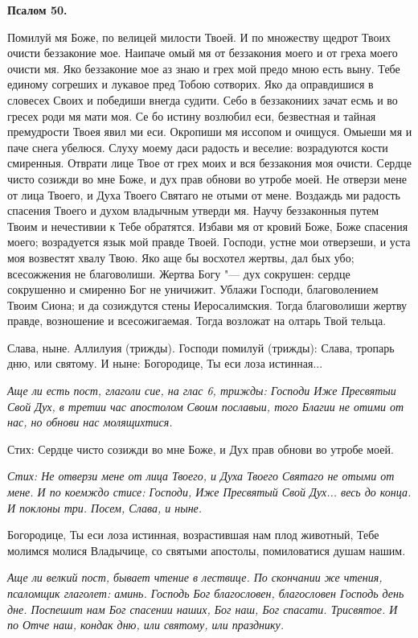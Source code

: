 \medskip


\bfseries Псалом 50.\normalfont{}\nopagebreak


Помилуй мя Боже, по велицей милости Твоей. И по множеству щедрот Твоих очисти беззаконие мое. Наипаче омый мя от беззакония моего и от греха моего очисти мя. Яко беззаконие мое аз знаю и грех мой предо мною есть выну. Тебе единому согреших и лукавое пред Тобою сотворих. Яко да оправдишися в словесех Своих и победиши внегда судити. Себо в беззакониих зачат есмь и во гресех роди мя мати моя. Се бо истину возлюбил еси, безвестная и тайная премудрости Твоея явил ми еси. Окропиши мя иссопом и очищуся. Омыеши мя и паче снега убелюся. Слуху моему даси радость и веселие: возрадуются кости смиренныя. Отврати лице Твое от грех моих и вся беззакония моя очисти. Сердце чисто созижди во мне Боже, и дух прав обнови во утробе моей. Не отверзи мене от лица Твоего, и Духа Твоего Святаго не отыми от мене. Воздаждь ми радость спасения Твоего и духом владычным утверди мя. Научу беззаконныя путем Твоим и нечестивии к Тебе обратятся. Избави мя от кровий Боже, Боже спасения моего; возрадуется язык мой правде Твоей. Господи, устне мои отверзеши, и уста моя возвестят хвалу Твою. Яко аще бы восхотел жертвы, дал бых убо; всесожжения не благоволиши. Жертва Богу "--- дух сокрушен: сердце сокрушенно и смиренно Бог не уничижит. Ублажи Господи, благоволением Твоим Сиона; и да созиждутся стены Иеросалимския. Тогда благоволиши жертву правде, возношение и всесожигаемая. Тогда возложат на олтарь Твой тельца.

Слава, ныне. Аллилуия (трижды). Господи помилуй (трижды): Слава, тропарь дню, или святому. И ныне: Богородице, Ты еси лоза истинная...


\itshape Аще ли есть пост, глаголи сие, на глас 6, трижды:\normalfont{} Господи Иже Пресвятыи Свой Дух, в третии час апостолом Своим пославыи, того Благии не отими от нас, но обнови нас молящихтися.

Стих: Сердце чисто созижди во мне Боже, и Дух прав обнови во утробе моей.


\itshape Стих:\normalfont{} Не отверзи мене от лица Твоего, и Духа Твоего Святаго не отыми от мене. И по коемждо стисе: Господи, Иже Пресвятый Свой Дух... весь до конца. И поклоны три. Посем, Слава, и ныне. 

Богородице, Ты еси лоза истинная, возрастившая нам плод животный, Тебе молимся молися Владычице, со святыми апостолы, помиловатися душам нашим.


\itshape Аще ли велкий пост, бывает чтение в лествице.\normalfont{} По скончании же чтения, псаломщик глаголет: аминь. Господь Бог благословен, благословен Господь день дне. Поспешит нам Бог спасении наших, Бог наш, Бог спасати. Трисвятое. И по Отче наш, кондак дню, или святому, или празднику.



